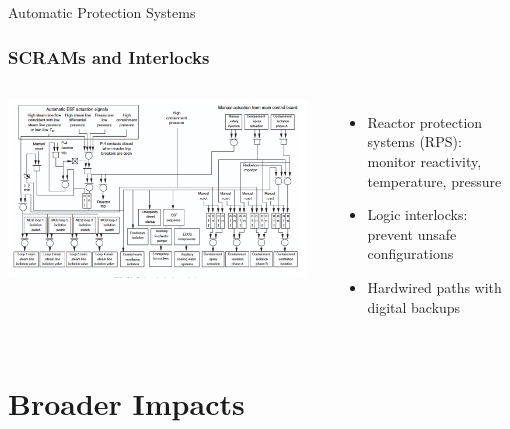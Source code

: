 \documentclass{beamer}
\begin{document}
\begin{frame}{Automatic Protection Systems}
  \subsubsection*{SCRAMs and Interlocks}
  \begin{columns}
    \includegraphics[width=0.95\textwidth]{safetylogic}

  \begin{itemize}
    \item Reactor protection systems (RPS): monitor reactivity, temperature, pressure
    \item Logic interlocks: prevent unsafe configurations
    \item Hardwired paths with digital backups
  \end{itemize}
\end{columns}
\end{frame}

\section{Broader Impacts}
\end{document}
